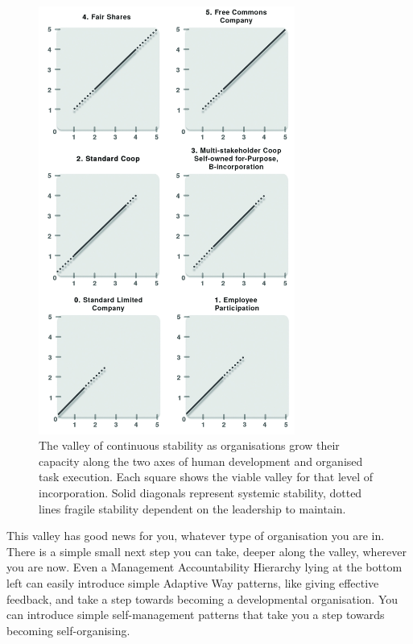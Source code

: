\begin{figure}
        \centering
\includegraphics[width=0.75\textwidth]{./Images/stable-valley}
\caption[Stable valley for growing your organisation to Level 555.]{The valley of continuous stability as organisations grow their capacity along the two axes of human development and organised task execution. Each square shows the viable valley for that level of incorporation. Solid diagonals represent systemic stability, dotted lines fragile stability dependent on the leadership to maintain.}
\label{fig:SDO-valley}
\end{figure}


This valley has good news for you, whatever type of organisation you are in. There is a simple small next step you can take, deeper along the valley, wherever you are now. Even a Management Accountability Hierarchy lying at the bottom left can easily introduce simple Adaptive Way  patterns, like giving effective feedback, and take a step towards becoming a developmental organisation. You can introduce simple self-management patterns that take you a step towards becoming self-organising. 


